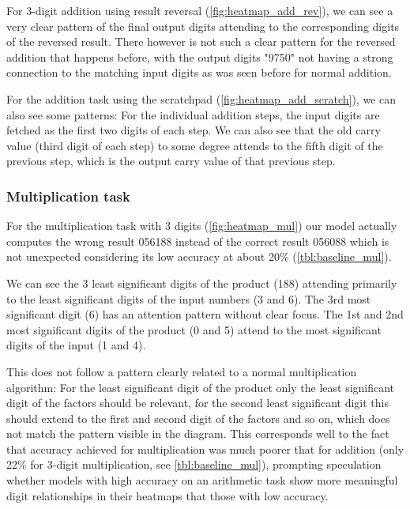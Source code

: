 For 3-digit addition using result reversal (\cref{fig:heatmap_add_rev}), we can see a very clear pattern of the final output digits attending to the corresponding digits of the reversed result. There however is not such a clear pattern for the reversed addition that happens before, with the output digits "9750" not having a strong connection to the matching input digits as was seen before for normal addition.


For the addition task using the scratchpad (\cref{fig:heatmap_add_scratch}), we can also see some patterns: For the individual addition steps, the input digits are fetched as the first two digits of each step. We can also see that the old carry value (third digit of each step) to some degree attends to the fifth digit of the previous step, which is the output carry value of that previous step.

\subsubsection{Multiplication task}


For the multiplication task with 3 digits (\cref{fig:heatmap_mul}) our model actually computes the wrong result 056188 instead of the correct result 056088 which is not unexpected considering its low accuracy at about 20\% (\cref{tbl:baseline_mul}).

We can see the 3 least significant digits of the product (188) attending primarily to the  least significant digits of the input numbers (3 and 6). The 3rd most significant digit (6) has an attention pattern without clear focus. The 1st and 2nd most significant digits of the product (0 and 5) attend to the most significant digits of the input (1 and 4).

This does not follow a pattern clearly related to a normal multiplication algorithm: For the least significant digit of the product only the least significant digit of the factors should be relevant, for the second least significant digit this should extend to the first and second digit of the factors and so on, which does not match the pattern visible in the diagram.
This corresponds well to the fact that accuracy achieved for multiplication was much poorer that for addition (only 22\% for 3-digit multiplication, see \cref{tbl:baseline_mul}), prompting speculation whether models with high accuracy on an arithmetic task show more meaningful digit relationships in their heatmaps that those with low accuracy.


